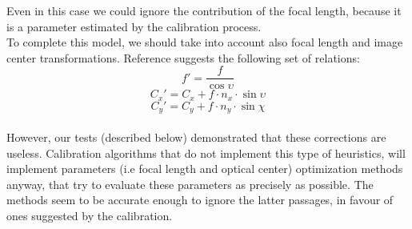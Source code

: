 \noindent
Even in this case we could ignore the contribution of the focal length, because it is a parameter estimated by the calibration process.\\

To complete this model, we should take into account also focal length and image center transformations. Reference \cite{SchCameraCalib} suggests the following set of relations:
  \begin{equation*}
    f' = \frac{f}{\cos\upsilon}
  \end{equation*}
  \begin{equation*}
    C_x' = C_x + f\cdot n_x \cdot \sin\upsilon
  \end{equation*}
  \begin{equation*}
    C_y' = C_y + f\cdot n_y \cdot \sin\chi
  \end{equation*} \\
However, our tests (described below) demonstrated that these corrections are useless. Calibration algorithms that do not implement this type of heuristics, will implement parameters (i.e focal length and optical center) optimization methods anyway, that try to evaluate these parameters as precisely as possible. The methods seem to be accurate enough to ignore the latter passages, in favour of ones suggested by the calibration.

